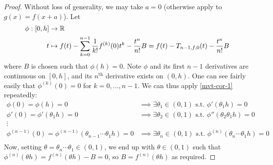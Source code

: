 \documentclass{../../template/note}
\begin{document}
    \begin{proof}
        Without loss of generality, we may take \(a=0\) (otherwise apply to \(g(x) = f(x+a)\)). Let
        \begin{align*}
            \phi: [0, h] &\to \mathbb R \\
            t &\mapsto f(t) - \sum_{k=0}^{n-1} \frac{1}{k!} f^{(k)}(0)t^k - \frac{t^n}{n!}B = f(t) - T_{n-1,f,0}(t) - \frac{t^n}{n!}B
        \end{align*}
        where \(B\) is chosen such that \(\phi(h) = 0\). Note \(\phi\) and its first \(n-1\) derivatives are continuous on \([0, h]\), and its \(n^\text{th}\) derivative exists on \((0, h)\). One can see fairly easily that \(\phi^{(k)}(0) = 0\) for \(k = 0, \dots, n-1\). We can thus apply \cref{mvt-cor-1} repeatedly:
        \begin{align*}
            \phi(0) = \phi(h) = 0 &\implies \exists \theta_1 \in (0, 1) \text{ s.t. } \phi'(\theta_1h) = 0 \\
            \phi'(0) = \phi'(\theta_1h) = 0 &\implies \exists \theta_2 \in (0, 1) \text{ s.t. } \phi''(\theta_2\theta_1h) = 0 \\
            \vdots \\
            \phi^{(n-1)}(0) = \phi^{(n-1)}(\theta_{n-1}\cdots\theta_1h) = 0 &\implies \exists \theta_n \in (0, 1) \text{ s.t. } \phi^{(n)}(\theta_n\cdots\theta_1h) = 0 \\
        \end{align*}
        Now, setting \(\theta = \theta_n \cdots \theta_1 \in (0, 1)\), we end up with \(\theta \in (0, 1)\) such that \(\phi^{(n)}(\theta h) = f^{(n)}(\theta h) - B = 0\), so \(B = f^{(n)}(\theta h)\) as required.
    \end{proof}
    
\end{document}
